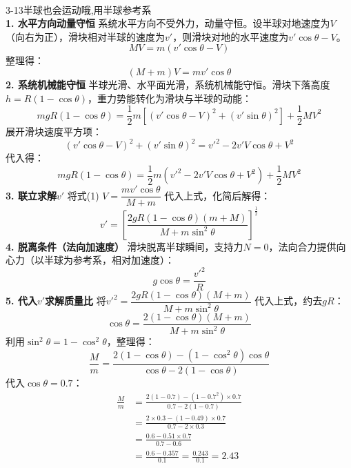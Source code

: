 \documentclass[12pt,a4paper]{article}
\begin{document}
\begin{enumerate}[label=\arabic*.,leftmargin=*]
{\\3-13半球也会运动哦,用半球参考系\\
\textbf{1. 水平方向动量守恒}
系统水平方向不受外力，动量守恒。设半球对地速度为$V$（向右为正），滑块相对半球的速度为$v'$，则滑块对地的水平速度为$v'\cos\theta - V$。
\[
MV = m(v'\cos\theta - V)
\]
整理得：
\[
(M + m)V = mv'\cos\theta \tag{1}
\]
\textbf{2. 系统机械能守恒}
半球光滑、水平面光滑，系统机械能守恒。滑块下落高度$h = R(1-\cos\theta)$，重力势能转化为滑块与半球的动能：
\[
mgR(1-\cos\theta) = \frac{1}{2}m\left[(v'\cos\theta - V)^2 + (v'\sin\theta)^2\right] + \frac{1}{2}MV^2
\]
展开滑块速度平方项：
\[
(v'\cos\theta - V)^2 + (v'\sin\theta)^2 = v'^2 - 2v'V\cos\theta + V^2
\]
代入得：
\[
mgR(1-\cos\theta) = \frac{1}{2}m(v'^2 - 2v'V\cos\theta + V^2) + \frac{1}{2}MV^2
\]
\textbf{3. 联立求解$v'$}
将式(1) $V = \dfrac{mv'\cos\theta}{M+m}$ 代入上式，化简后解得：
\[
v' = \left[ \frac{2gR(1-\cos\theta)(m+M)}{M + m\sin^2\theta} \right]^{\frac{1}{2}}
\]
\textbf{4. 脱离条件（法向加速度）}
滑块脱离半球瞬间，支持力$N=0$，法向合力提供向心力（以半球为参考系，相对加速度）：
\[
g\cos\theta = \frac{v'^2}{R}
\]
\textbf{5. 代入$v'$求解质量比}
将$v'^2 = \dfrac{2gR(1-\cos\theta)(M+m)}{M + m\sin^2\theta}$ 代入上式，约去$gR$：
\[
\cos\theta = \frac{2(1-\cos\theta)(M+m)}{M + m\sin^2\theta}
\]
利用$\sin^2\theta = 1-\cos^2\theta$，整理得：
\[
\frac{M}{m} = \frac{2(1-\cos\theta) - (1-\cos^2\theta)\cos\theta}{\cos\theta - 2(1-\cos\theta)}
\]
代入$\cos\theta = 0.7$：
\begin{align*}
\frac{M}{m} &= \frac{2(1-0.7) - (1-0.7^2)\times0.7}{0.7 - 2(1-0.7)} \\
&= \frac{2\times0.3 - (1-0.49)\times0.7}{0.7 - 2\times0.3} \\
&= \frac{0.6 - 0.51\times0.7}{0.7 - 0.6} \\
&= \frac{0.6 - 0.357}{0.1} = \frac{0.243}{0.1} = 2.43
\end{align*}
    }
\end{enumerate}
\end{document}
